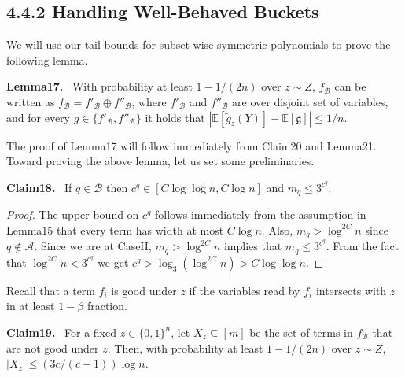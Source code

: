 \documentclass[10pt,a4paper]{article}
\newenvironment{authorclaim}[1]{\par\medskip\noindent\textbf{#1.}\ \ignorespaces}{\par\medskip}
\begin{document}
\subsection*{4.4.2 Handling Well-Behaved Buckets}
We will use our tail bounds for subset-wise symmetric polynomials to prove the following lemma.
\begin{authorclaim}{Lemma17}
With probability at least $1-1/(2n)$ over $z\sim Z$, $f_{\mathcal B}$ can be written as $f_{\mathcal B}=f'_{\mathcal B}\oplus f''_{\mathcal B}$, where $f'_{\mathcal B}$ and $f''_{\mathcal B}$ are over disjoint set of variables, and for every $g\in\{f'_{\mathcal B},f''_{\mathcal B}\}$ it holds that $|\mathbb E[\widetilde g_z(Y)]-\mathbb E[\mathfrak g]|\le1/n$.
\end{authorclaim}
The proof of Lemma17 will follow immediately from Claim20 and Lemma21. Toward proving the above lemma, let us set some preliminaries.
\begin{authorclaim}{Claim18}
If $q\in\mathcal B$ then $c^q\in[C\log\log n,C\log n]$ and $m_q\le3^{c^q}$.
\end{authorclaim}
\begin{proof}
The upper bound on $c^q$ follows immediately from the assumption in Lemma15 that every term has width at most $C\log n$. Also, $m_q>\log^{2C}n$ since $q\notin\mathcal A$. Since we are at CaseII, $m_q>\log^{2C}n$ implies that $m_q\le3^{c^q}$. From the fact that $\log^{2C}n<3^{c^q}$ we get $c^q>\log_3(\log^{2C}n)>C\log\log n$.
\end{proof}
Recall that a term $f_i$ is good under $z$ if the variables read by $f_i$ intersects with $z$ in at least $1-\beta$ fraction.
\begin{authorclaim}{Claim19}
For a fixed $z\in\{0,1\}^n$, let $X_z\subseteq[m]$ be the set of terms in $f_{\mathcal B}$ that are not good under $z$. Then, with probability at least $1-1/(2n)$ over $z\sim Z$, $|X_z|\le(3c/(c-1))\log n$.
\end{authorclaim}
\end{document}
